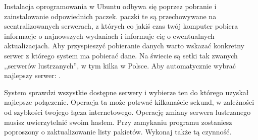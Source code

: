 Instalacja oprogramowania w Ubuntu odbywa się poprzez pobranie i zainstalowanie odpowiednich paczek. paczki te są przechowywane na scentralizowanych serwerach, z których co jakiś czas twój komputer pobiera informacje o najnowszych wydaniach i informuje cię o ewentualnych aktualizacjach. Aby przyspieszyć pobieranie danych warto wskazać konkretny serwer z którego system ma pobierać dane. Na świecie są setki tak zwanych ,,serwerów lustrzanych'', w tym kilka w Polsce. Aby automatycznie wybrać najlepszy serwer: .

System sprawdzi wszystkie dostępne serwery i wybierze ten do którego uzyskał najlepsze połączenie. Operacja ta może potrwać kilkanaście sekund, w zależności od szybkości twojego łącza internetowego. Operację zmiany serwera lustrzanego musisz uwierzytelnić swoim hasłem. Przy zamykaniu programu zostaniesz poproszony o zaktualizowanie listy pakietów. Wykonaj także tą czynność.